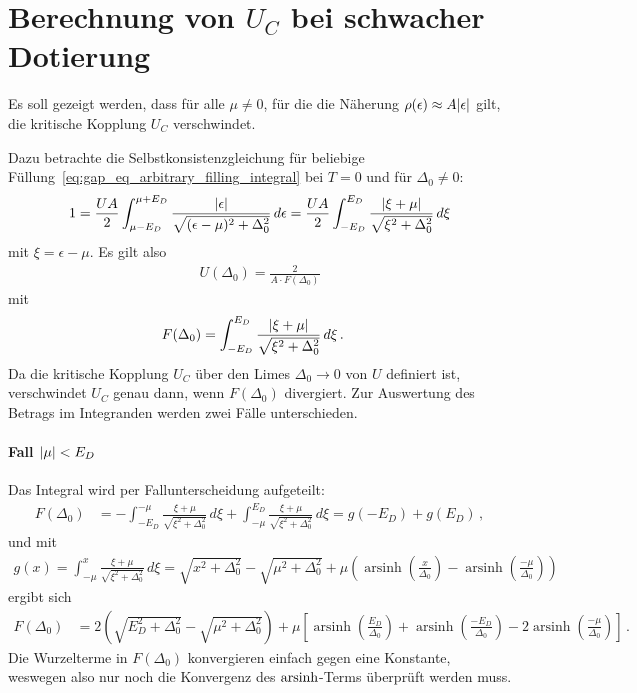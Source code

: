 \chapter{Berechnung von $U_C$ bei schwacher Dotierung}\label{sec:anhang_b}

Es soll gezeigt werden, dass für alle $\mu \neq 0$, für die die Näherung $\rho(\epsilon) \approx A \abs{\epsilon}$ gilt, die kritische Kopplung $U_C$ verschwindet.

Dazu betrachte die Selbstkonsistenzgleichung für beliebige Füllung~\eqref{eq:gap_eq_arbitrary_filling_integral} bei $T= 0$ und für $\Delta_0 \neq 0$:
\begin{align}
1 = \frac{UA}{2} \int_{\mu - E_D}^{\mu + E_D} \frac{\abs{\epsilon}}{\sqrt{(\epsilon - \mu)^2 + \Delta_0^2}} \, d\epsilon = \frac{UA}{2} \int_{-E_D}^{E_D} \frac{\abs{\xi + \mu}}{\sqrt{\xi^2 + \Delta_0^2}} \,  d\xi
\end{align}
mit $\xi = \epsilon - \mu$. Es gilt also
\begin{align}
    U(\Delta_0) = \frac{2}{A\cdot F(\Delta_0)}
\end{align}
mit
\begin{align}
    F(\Delta_0) &= \int_{-E_D}^{E_D} \frac{\abs{\xi + \mu}}{\sqrt{\xi^2 + \Delta_0^2}} \,  d\xi \, .
\end{align}
Da die kritische Kopplung $U_C$ über den Limes $\Delta_0 \rightarrow 0$ von $U$ definiert ist, verschwindet $U_C$ genau dann, wenn $F(\Delta_0)$ divergiert. Zur Auswertung des Betrags im Integranden werden zwei Fälle unterschieden.

\subsubsection{Fall $\abs{\mu} < E_D$}

Das Integral wird per Fallunterscheidung aufgeteilt:
\begin{align}
    F(\Delta_0) &= -\int_{-E_D}^{-\mu} \frac{\xi + \mu}{\sqrt{\xi^2 + \Delta_0^2}} \, d\xi + \int_{-\mu}^{E_D} \frac{\xi + \mu}{\sqrt{\xi^2 + \Delta_0^2}}\, d\xi = g(-E_D) + g(E_D) \, ,
\end{align}
und mit
\begin{align}
    g(x) = \int_{-\mu}^{x} \frac{\xi + \mu}{\sqrt{\xi^2 + \Delta_0^2}}\, d\xi = \sqrt{x^2 + \Delta_0^2} - \sqrt{\mu^2 + \Delta_0^2} + \mu \left(\operatorname{arsinh}\left(\frac{x}{\Delta_0}\right) - \operatorname{arsinh}\left(\frac{-\mu}{\Delta_0}\right)\right)
\end{align}
ergibt sich
\begin{align}
    F(\Delta_0) &= 2\left(\sqrt{E_D^2 + \Delta_0^2} - \sqrt{\mu^2 + \Delta_0^2}\right) + \mu \left[\operatorname{arsinh}\left(\frac{E_D}{\Delta_0}\right) + \operatorname{arsinh}\left(\frac{-E_D}{\Delta_0}\right) - 2 \operatorname{arsinh}\left(\frac{-\mu}{\Delta_0}\right)  \right] \, .
\end{align}
Die Wurzelterme in $F(\Delta_0)$ konvergieren einfach gegen eine Konstante, weswegen also nur noch die Konvergenz des $\operatorname{arsinh}$-Terms überprüft werden muss.

